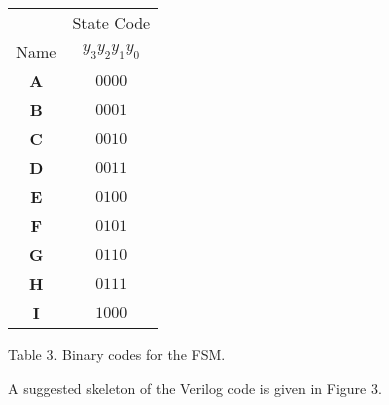 \documentclass[epsfig,10pt,fullpage]{article}
\begin{document}
\begin{center}
\begin{tabular}{c|c}
~ & State Code \\ 
Name & $y_3 y_2 y_1 y_0$ \\ \hline
\rule[-0.075in]{0in}{0.25in}{\bf A} & $0000$ \\ 
{\bf B} & $0001$ \\ 
{\bf C} & $0010$ \\ 
{\bf D} & $0011$ \\ 
{\bf E} & $0100$ \\ 
{\bf F} & $0101$ \\ 
{\bf G} & $0110$ \\ 
{\bf H} & $0111$ \\ 
{\bf I} & $1000$ \\ 
\end{tabular}
\end{center}

\begin{center}
Table 3. Binary codes for the FSM.
\end{center}

\noindent
A suggested skeleton of the Verilog code is given in Figure 3.
\end{document}
